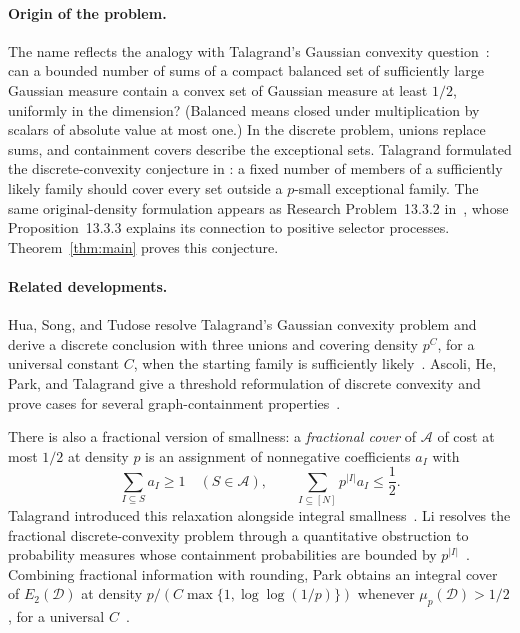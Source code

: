\documentclass[11pt,letterpaper]{article}
\theoremstyle{definition}
\theoremstyle{remark}
\numberwithin{equation}{section}
\begin{document}
\paragraph{Origin of the problem.}
The name reflects the analogy with Talagrand's Gaussian convexity
question~\cite[Conjecture~2.1]{Talagrand10}: can a bounded number of
sums of a compact balanced set of sufficiently large Gaussian measure
contain a convex set of Gaussian measure at least $1/2$, uniformly in
the dimension? (Balanced means closed under multiplication by scalars of
absolute value at most one.) In the discrete problem, unions replace sums,
and containment covers describe the exceptional sets. Talagrand formulated
the discrete-convexity conjecture in \cite[Conjecture~7.1]{Talagrand10}: a
fixed number of members of a sufficiently likely family should cover every
set outside a $p$-small exceptional family. The same original-density
formulation appears as Research Problem~13.3.2 in~\cite{Talagrand21}, whose
Proposition~13.3.3 explains its connection to positive selector processes.
Theorem~\ref{thm:main} proves this conjecture.

\paragraph{Related developments.}
Hua, Song, and Tudose resolve Talagrand's Gaussian convexity problem and
derive a discrete conclusion with three unions and covering density
$p^C$, for a universal constant $C$, when the starting family is
sufficiently likely~\cite[Corollaries~1.3--1.4]{HuaSongTudose26}.
Ascoli, He, Park, and Talagrand give a threshold reformulation of discrete
convexity and prove cases for several graph-containment
properties~\cite[Proposition~1.5 and Theorems~1.10--1.13]{AscoliEtAl26}.

There is also a fractional version of smallness: a \emph{fractional
cover} of $\mathcal A$ of cost at most $1/2$ at density $p$ is an
assignment of nonnegative coefficients $a_I$ with
\[
\sum_{I\subseteq S}a_I\ge1\quad(S\in\mathcal A),
\qquad
\sum_{I\subseteq[N]}p^{|I|}a_I\le\frac12.
\]
Talagrand introduced this relaxation alongside integral
smallness~\cite[Sections~6 and~7]{Talagrand10}.
Li resolves the fractional discrete-convexity problem through a quantitative
obstruction to probability measures whose containment probabilities
are bounded by $p^{|I|}$~\cite[Theorem~1.9]{Li26}.
Combining fractional information with rounding, Park obtains an integral
cover of $E_2(\mathcal D)$ at density
$p/(C\max\{1,\log\log(1/p)\})$
whenever $\mu_p(\mathcal D)>1/2$, for a universal
$C$~\cite[Corollary~3.5]{Park26}.
\end{document}
